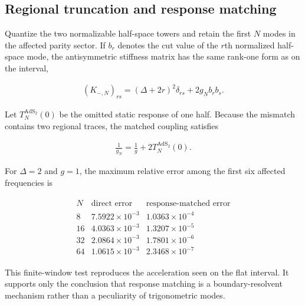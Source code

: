 \subsection{Regional truncation and response matching}\label{subsec:ads2-matching}

Quantize the two normalizable half-space towers and retain the first $N$ modes in the affected parity sector. If $b_r$ denotes the cut value of the $r$th normalized half-space mode, the antisymmetric stiffness matrix has the same rank-one form as on the interval,

\begin{align}
(K_{-,N})_{rs}
=(\Delta+2r)^2\delta_{rs}+2g_Nb_rb_s.
\end{align}

Let $T_N^{\mathrm{AdS}_2}(0)$ be the omitted static response of one half. Because the mismatch contains two regional traces, the matched coupling satisfies

\begin{align}
\frac1{g_N}
=\frac1g+2T_N^{\mathrm{AdS}_2}(0).
\end{align}

For $\Delta=2$ and $g=1$, the maximum relative error among the first six affected frequencies is

\begin{align}
\begin{array}{c|cc}
N&\text{direct error}&\text{response-matched error}\\ \hline
8&7.5922\times10^{-3}&1.0363\times10^{-4}\\
16&4.0363\times10^{-3}&1.3207\times10^{-5}\\
32&2.0864\times10^{-3}&1.7801\times10^{-6}\\
64&1.0615\times10^{-3}&2.3468\times10^{-7}
\end{array}
\end{align}

This finite-window test reproduces the acceleration seen on the flat interval. It supports only the conclusion that response matching is a boundary-resolvent mechanism rather than a peculiarity of trigonometric modes.
